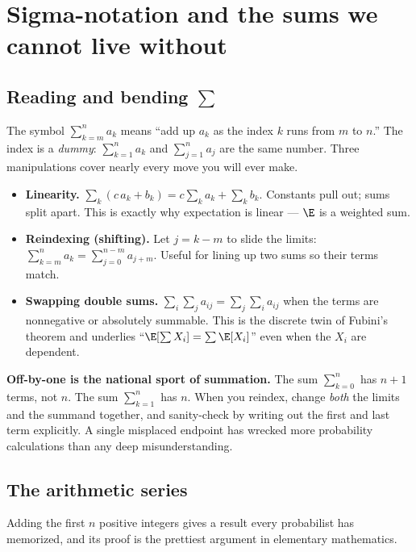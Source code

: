 \section{Sigma-notation and the sums we cannot live without}
\label{ch39:sums}

\subsection{Reading and bending $\sum$}

The symbol $\sum_{k=m}^{n} a_k$ means ``add up $a_k$ as the index $k$ runs
from $m$ to $n$.'' The index is a \emph{dummy}: $\sum_{k=1}^n a_k$ and
$\sum_{j=1}^n a_j$ are the same number. Three manipulations cover nearly every
move you will ever make.

\begin{itemize}
  \item \textbf{Linearity.} $\displaystyle \sum_k (c\,a_k + b_k) = c\sum_k a_k
        + \sum_k b_k$. Constants pull out; sums split apart. This is exactly
        why expectation is linear --- $\E$ is a weighted sum.
  \item \textbf{Reindexing (shifting).} Let $j = k - m$ to slide the limits:
        $\sum_{k=m}^{n} a_k = \sum_{j=0}^{n-m} a_{j+m}$. Useful for lining up
        two sums so their terms match.
  \item \textbf{Swapping double sums.} $\sum_{i}\sum_{j} a_{ij} =
        \sum_{j}\sum_{i} a_{ij}$ when the terms are nonnegative or absolutely
        summable. This is the discrete twin of Fubini's theorem and underlies
        ``$\E[\sum X_i] = \sum \E[X_i]$'' even when the $X_i$ are dependent.
\end{itemize}

\begin{trapbox}
\textbf{Off-by-one is the national sport of summation.} The sum
$\sum_{k=0}^{n}$ has $n+1$ terms, not $n$. The sum $\sum_{k=1}^{n}$ has $n$.
When you reindex, change \emph{both} the limits and the summand together, and
sanity-check by writing out the first and last term explicitly. A single
misplaced endpoint has wrecked more probability calculations than any deep
misunderstanding.
\end{trapbox}

\subsection{The arithmetic series}

Adding the first $n$ positive integers gives a result every probabilist has
memorized, and its proof is the prettiest argument in elementary mathematics.

